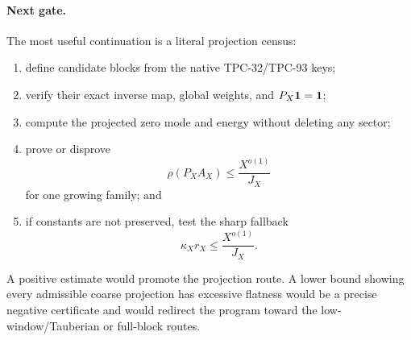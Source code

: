 \paragraph{Next gate.}
The most useful continuation is a literal projection census:
\begin{enumerate}[label=(\arabic*),leftmargin=2.2em]
\item define candidate blocks from the native TPC-32/TPC-93 keys;
\item verify their exact inverse map, global weights, and
  \(P_X\mathbf 1=\mathbf 1\);
\item compute the projected zero mode and energy without deleting
  any sector;
\item prove or disprove
  \[
  \rho(P_XA_X)\le\frac{X^{o(1)}}{J_X}
  \]
  for one growing family; and
\item if constants are not preserved, test the sharp fallback
  \[
  \kappa_Xr_X
  \le\frac{X^{o(1)}}{J_X}.
  \]
\end{enumerate}
A positive estimate would promote the projection route.  A lower
bound showing every admissible coarse projection has excessive
flatness would be a precise negative certificate and would redirect
the program toward the low-window/Tauberian or full-block routes.
